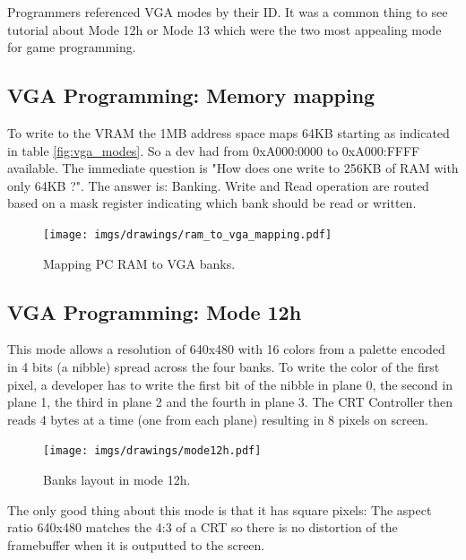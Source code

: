 \documentclass[book.tex]{subfiles}
\begin{document}
 Programmers referenced VGA modes by their ID. It was a common thing to see tutorial about Mode 12h or Mode 13 which were the two most appealing mode for game programming.


 \subsection{VGA Programming: Memory mapping}
To write to the VRAM the 1MB address space maps 64KB starting as indicated in table \ref{fig:vga_modes}. So a dev had from 0xA000:0000 to 0xA000:FFFF available. The immediate question is "How does one write to 256KB of RAM with only 64KB ?". The answer is: Banking. Write and Read operation are routed based on a mask register indicating which bank should be read or written.\\
\par
 \begin{figure}[H]
\centering
  
      \texttt{[image: imgs/drawings/ram\_to\_vga\_mapping.pdf]}
    
\caption{Mapping PC RAM to VGA banks.}
\end{figure}



 

 \subsection{VGA Programming: Mode 12h}
 This mode allows a resolution of 640x480 with 16 colors from a palette encoded in 4 bits (a nibble) spread across the four banks. To write the color of the first pixel, a developer has to write the first bit of the nibble in plane 0, the second in plane 1, the third in plane 2 and the fourth in plane 3. The CRT Controller then reads 4 bytes at a time (one from each plane) resulting in 8 pixels on screen.\\
\par
\begin{figure}[H]
\centering
 \texttt{[image: imgs/drawings/mode12h.pdf]}
\caption{Banks layout in mode 12h.}
\end{figure}
\par

The only good thing about this mode is that it has square pixels: The aspect ratio 640x480 matches the 4:3 of a CRT so there is no distortion of the framebuffer when it is outputted to the screen.\\
\par
\end{document}
